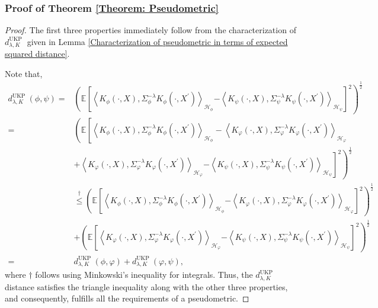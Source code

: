 \documentclass{article}
\theoremstyle{plain}
\newcommand{\E}{\mathbb{E}}
\newcommand{\repone}{\phi}
\newcommand{\reptwo}{\psi}
\newcommand{\repthree}{\varphi}
\newcommand{\Hone}{\mathcal{H}_{\phi}}
\newcommand{\Htwo}{\mathcal{H}_{\psi}}
\newcommand{\Hthree}{\mathcal{H}_{\varphi}}
\newcommand{\inprod}[1]{\left \langle #1 \right\rangle}
\newcommand{\metricstname}{UKP }
\begin{document}
\subsubsection{Proof of Theorem \ref{Theorem: Pseudometric}}\label{Proof of Theorem 1}

\begin{proof}
    The first three properties immediately follow from the characterization of $d_{\lambda,K}^{\text{\metricstname}}$ given in Lemma \ref{Characterization of pseudometric in terms of expected squared distance}.

    Note that,
    \[
    \begin{aligned}
        d_{\lambda,K}^{\text{\metricstname}}(\repone,\reptwo)
        =& \left(\E  \left[\inprod{K_{\repone}(\cdot,X),\Sigma_{\repone}^{-\lambda}K_{\repone}(\cdot,X^{\prime})}_{\Hone} \right.\right. \left.\left. -\inprod{K_{\reptwo}(\cdot,X),\Sigma_{\reptwo}^{-\lambda}K_{\reptwo}(\cdot,X^{\prime})}_{\Htwo}\right]^{2}\right)^{\frac{1}{2}}\\
        =& \left(\E  \left[\inprod{K_{\repone}(\cdot,X),\Sigma_{\repone}^{-\lambda}K_{\repone}(\cdot,X^{\prime})}_{\Hone} \right.\right.  -\inprod{K_{\repthree}(\cdot,X),\Sigma_{\repthree}^{-\lambda}K_{\repthree}(\cdot,X^{\prime})}_{\Hthree}\\
        &+\inprod{K_{\repthree}(\cdot,X),\Sigma_{\repthree}^{-\lambda}K_{\repthree}(\cdot,X^{\prime})}_{\Hthree}\left.\left. -\inprod{K_{\reptwo}(\cdot,X),\Sigma_{\reptwo}^{-\lambda}K_{\reptwo}(\cdot,X^{\prime})}_{\Htwo}\right]^{2}\right)^{\frac{1}{2}}\\
        &\overset{\dagger}{\leq} \left(\E  \left[\inprod{K_{\repone}(\cdot,X),\Sigma_{\repone}^{-\lambda}K_{\repone}(\cdot,X^{\prime})}_{\Hone} \right.\right. \left.\left. -\inprod{K_{\repthree}(\cdot,X),\Sigma_{\repthree}^{-\lambda}K_{\repthree}(\cdot,X^{\prime})}_{\Hthree}\right]^{2}\right)^{\frac{1}{2}}\\
        &+ \left(\E  \left[\inprod{K_{\repthree}(\cdot,X),\Sigma_{\repthree}^{-\lambda}K_{\repthree}(\cdot,X^{\prime})}_{\Hthree} \right.\right. \left.\left. -\inprod{K_{\reptwo}(\cdot,X),\Sigma_{\reptwo}^{-\lambda}K_{\reptwo}(\cdot,X^{\prime})}_{\Htwo}\right]^{2}\right)^{\frac{1}{2}}\\
        =&  d_{\lambda,K}^{\text{\metricstname}}(\repone,\repthree) + d_{\lambda,K}^{\text{\metricstname}}(\repthree,\reptwo),
    \end{aligned}
    \]
    where $\dagger$ follows using Minkowski's inequality for integrals. Thus, the $d_{\lambda,K}^{\text{\metricstname}}$ distance satisfies the triangle inequality along with the other three properties, and consequently, fulfills all the requirements of a pseudometric.
\end{proof}
\end{document}
